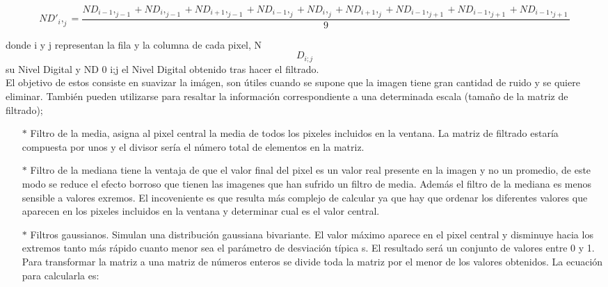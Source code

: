 \begin{displaymath}
N D'_i,_j=\frac{ND_{i-1},_{j-1} + ND_{i},_{j-1} + ND_{i+1},_{j-1} + ND_{i-1},_{j} + ND_{i},_{j} + ND_{i+1},_{j} + ND_{i-1},_{j+1} + ND_{i-1},_{j+1} + ND_{i-1},_{j+1}}{9}
\end{displaymath}

donde i y j representan la fila y la columna de cada pixel, N \[D_{i;j}\] su Nivel Digital y ND 0 i;j el Nivel Digital obtenido tras hacer el filtrado.\\

El objetivo de estos consiste en suavizar la im\'agen, son útiles cuando se supone que la imagen tiene gran cantidad de ruido y se quiere eliminar. También pueden utilizarse para resaltar la información correspondiente a una determinada escala (tamaño de la matriz de filtrado); 

\begin{itemize}
	\item[$*$] Filtro de la media, asigna al pixel central la media de todos los pixeles incluidos en la ventana. La matriz de filtrado estaría compuesta por unos y el divisor sería el número total de elementos en la matriz.					\item[$*$] Filtro de la mediana tiene la ventaja de que el valor final del pixel es un valor real presente en la imagen y no un promedio, de este modo se reduce el efecto borroso que tienen las imagenes que han sufrido un filtro de media. Además el filtro de la mediana es menos sensible a valores exremos. El incoveniente es que resulta más complejo de calcular ya que hay que ordenar los diferentes valores que aparecen en los pixeles incluidos en la ventana y determinar cual es el valor central.
	\item[$*$]Filtros gaussianos. Simulan una distribución gaussiana bivariante. El valor máximo aparece en el pixel central y disminuye hacia los extremos tanto más rápido cuanto menor sea el parámetro de desviación típica s. El resultado será un conjunto de valores entre 0 y 1. Para transformar la matriz a una matriz de números enteros se divide toda la matriz por el menor de los valores obtenidos. La ecuación para calcularla es:
\end{itemize}

